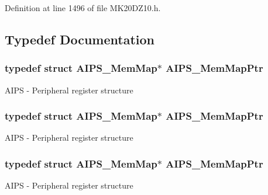 Definition at line 1496 of file M\+K20\+D\+Z10.\+h.



\subsection{Typedef Documentation}
\subsubsection[{\texorpdfstring{A\+I\+P\+S\+\_\+\+Mem\+Map\+Ptr}{AIPS_MemMapPtr}}]{\setlength{\rightskip}{0pt plus 5cm}typedef struct {\bf A\+I\+P\+S\+\_\+\+Mem\+Map}$\ast$ {\bf A\+I\+P\+S\+\_\+\+Mem\+Map\+Ptr}}\hypertarget{group___a_i_p_s___peripheral_ga6a37456f1049f1d08787b6ffe1c8a9b3}{}\label{group___a_i_p_s___peripheral_ga6a37456f1049f1d08787b6ffe1c8a9b3}
A\+I\+PS -\/ Peripheral register structure 
\subsubsection[{\texorpdfstring{A\+I\+P\+S\+\_\+\+Mem\+Map\+Ptr}{AIPS_MemMapPtr}}]{\setlength{\rightskip}{0pt plus 5cm}typedef struct {\bf A\+I\+P\+S\+\_\+\+Mem\+Map}$\ast$ {\bf A\+I\+P\+S\+\_\+\+Mem\+Map\+Ptr}}\hypertarget{group___a_i_p_s___peripheral_ga6a37456f1049f1d08787b6ffe1c8a9b3}{}\label{group___a_i_p_s___peripheral_ga6a37456f1049f1d08787b6ffe1c8a9b3}
A\+I\+PS -\/ Peripheral register structure 
\subsubsection[{\texorpdfstring{A\+I\+P\+S\+\_\+\+Mem\+Map\+Ptr}{AIPS_MemMapPtr}}]{\setlength{\rightskip}{0pt plus 5cm}typedef struct {\bf A\+I\+P\+S\+\_\+\+Mem\+Map}$\ast$ {\bf A\+I\+P\+S\+\_\+\+Mem\+Map\+Ptr}}\hypertarget{group___a_i_p_s___peripheral_ga6a37456f1049f1d08787b6ffe1c8a9b3}{}\label{group___a_i_p_s___peripheral_ga6a37456f1049f1d08787b6ffe1c8a9b3}
A\+I\+PS -\/ Peripheral register structure 